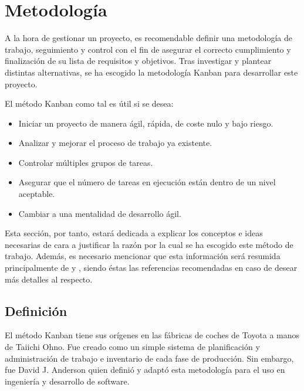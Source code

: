 \section{Metodología}\label{sec:metodologia}

A la hora de gestionar un proyecto, es recomendable definir una metodología de
trabajo, seguimiento y control con el fin de asegurar el correcto cumplimiento y
finalización de su lista de requisitos y objetivos. Tras investigar y plantear
distintas alternativas, se ha escogido la metodología Kanban para desarrollar
este proyecto.

El método Kanban como tal es útil si se desea:
\begin{itemize}
    \item Iniciar un proyecto de manera ágil, rápida, de coste nulo y bajo riesgo. %
    \item Analizar y mejorar el proceso de trabajo ya existente. %
    \item Controlar múltiples grupos de tareas. %
    \item Asegurar que el número de tareas en ejecución están dentro de un nivel aceptable. %
    \item Cambiar a una mentalidad de desarrollo ágil. %
\end{itemize}

Esta sección, por tanto, estará dedicada a explicar los conceptos e ideas
necesarias de cara a justificar la razón por la cual se ha escogido este método
de trabajo. Además, es necesario mencionar que esta información será resumida
principalmente de \cite{Cole2015-fd} y \cite{Stellman2014-qr}, siendo éstas las
referencias recomendadas en caso de desear más detalles al respecto.
\subsection{Definición}

El método Kanban tiene sus orígenes en las fábricas de coches de Toyota a manos
de Taiichi Ohno. Fue creado como un simple sistema de planificación y
administración de trabajo e inventario de cada fase de producción. Sin embargo,
fue David J. Anderson quien definió y adaptó esta metodología para el uso en
ingeniería y desarrollo de software.

